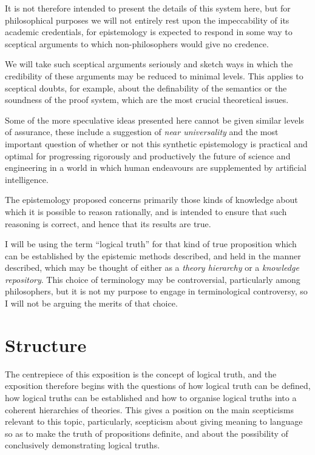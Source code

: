 \documentclass[10pt,titlepage]{book}
\begin{document}
It is not therefore intended to present the details of this system here, but for philosophical purposes we will not entirely rest upon the impeccability of its academic credentials, for epistemology is expected to respond in some way to sceptical arguments to which non-philosophers would give no credence.

We will take such sceptical arguments seriously and sketch ways in which the credibility of these arguments may be reduced to minimal levels.
This applies to sceptical doubts, for example, about the definability of the semantics or the soundness of the proof system, which are the most crucial theoretical issues.

Some of the more speculative ideas presented here cannot be given similar levels of assurance, these include a suggestion of \emph{near universality} and the most important question of whether or not this synthetic epistemology is practical and optimal for progressing rigorously and productively the future of science and engineering in a world in which human endeavours are supplemented by artificial intelligence.

The epistemology proposed concerns primarily those kinds of knowledge about which it is possible to reason rationally, and is intended to ensure that such reasoning is correct, and hence that its results are true.

I will be using the term ``logical truth'' for that kind of true proposition which can be established by the epistemic methods described, and held in the manner described, which may be thought of either as a \emph{theory hierarchy} or a \emph{knowledge repository}.
This choice of terminology may be controversial, particularly among philosophers, but it is not my purpose to engage in terminological controversy, so I will not be arguing the merits of that choice.

\section{Structure}

The centrepiece of this exposition is the concept of logical truth, and the exposition therefore begins with the questions of how logical truth can be defined, how logical truths can be established and how to organise logical truths into a coherent hierarchies of theories.
This gives a position on the main scepticisms relevant to this topic, particularly, scepticism about giving meaning to language so as to make the truth of propositions definite, and about the possibility of conclusively demonstrating logical truths.
\end{document}
